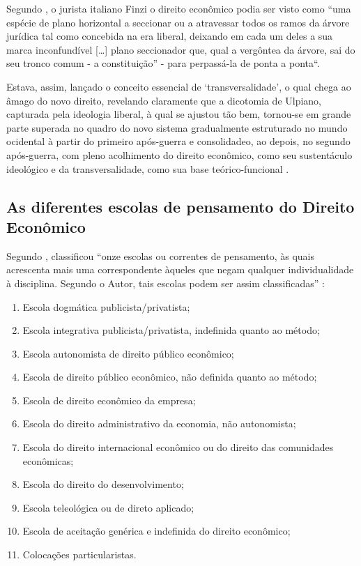 \documentclass[
	10pt,				%
	openright,			%
	twoside,			%
	a5paper,			%
	english,			%
	french,				%
	spanish,			%
	brazil				%
	]{abntex2}
\renewenvironment{quote}
  {\small\list{}{\rightmargin=0.1cm \leftmargin=4cm}%
   \item\relax}
  {\endlist}
\begin{document}
Segundo , o jurista italiano Finzi o direito
econômico podia ser visto como ``uma espécie de plano horizontal a
seccionar ou a atravessar todos os ramos da árvore jurídica tal como
concebida na era liberal, deixando em cada um deles a sua marca
inconfundível {[}\ldots{}{]} plano seccionador que, qual a vergôntea da
árvore, sai do seu tronco comum - a constituição'' - para perpassá-la de
ponta a ponta``.

\begin{quote}
Estava, assim, lançado o conceito essencial de `transversalidade', o
qual chega ao âmago do novo direito, revelando claramente que a
dicotomia de Ulpiano, capturada pela ideologia liberal, à qual se
ajustou tão bem, tornou-se em grande parte superada no quadro do novo
sistema gradualmente estruturado no mundo ocidental à partir do primeiro
após-guerra e consolidadeo, ao depois, no segundo após-guerra, com pleno
acolhimento do direito econômico, como seu sustentáculo ideológico e da
transversalidade, como sua base teórico-funcional \cite[p.~24]{Nusdeo}.
\end{quote}

\subsection{As diferentes escolas de pensamento do Direito
Econômico}\label{as-diferentes-escolas-de-pensamento-do-direito-econuxf4mico}

Segundo , 
classificou ``onze escolas ou correntes de pensamento, às quais
acrescenta mais uma correspondente àqueles que negam qualquer
individualidade à disciplina. Segundo o Autor, tais escolas podem ser
assim classificadas'' \cite[p.26]{Nusdeo}:

\begin{enumerate}
\def\labelenumi{\arabic{enumi})}
\tightlist
\item
  Escola dogmática publicista/privatista;
\item
  Escola integrativa publicista/privatista, indefinida quanto ao método;
\item
  Escola autonomista de direito público econômico;
\item
  Escola de direito público econômico, não definida quanto ao método;
\item
  Escola de direito econômico da empresa;
\item
  Escola do direito administrativo da economia, não autonomista;
\item
  Escola do direito internacional econômico ou do direito das
  comunidades econômicas;
\item
  Escola do direito do desenvolvimento;
\item
  Escola teleológica ou de direto aplicado;
\item
  Escola de aceitação genérica e indefinida do direito econômico;
\item
  Colocações particularistas.
\end{enumerate}
\end{document}
